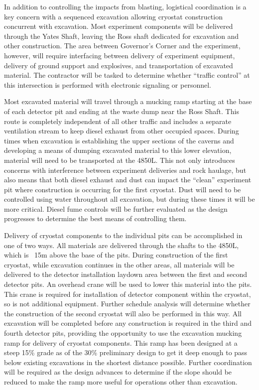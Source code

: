 In addition to controlling the impacts from blasting, logistical coordination is a key concern with a sequenced excavation allowing cryostat construction concurrent with excavation.  Most experiment components will be delivered through the Yates Shaft, leaving the Ross shaft dedicated for excavation and other construction.  The area between Governor’s Corner and the experiment, however, will require interfacing between delivery of experiment equipment, delivery of ground support and explosives, and transportation of excavated material.  The contractor will be tasked to determine whether “traffic control” at this intersection is performed with electronic signaling or personnel.

Most excavated material will travel through a mucking ramp starting at the base of each detector pit and ending at the waste dump near the Ross Shaft.  This route is completely independent of all other traffic and includes a separate ventilation stream to keep diesel exhaust from other occupied spaces.  During times when excavation is establishing the upper sections of the caverns and developing a means of dumping excavated material to this lower elevation, material will need to be transported at the 4850L.  This not only introduces concerns with interference between experiment deliveries and rock haulage, but also means that both diesel exhaust and dust can impact the “clean” experiment pit where construction is occurring for the first cryostat.  Dust will need to be controlled using water throughout all excavation, but during these times it will be more critical.  Diesel fume controls will be further evaluated as the design progresses to determine the best means of controlling them.

Delivery of cryostat components to the individual pits can be accomplished in one of two ways.  All materials are delivered through the shafts to the 4850L, which is ~15m above the base of the pits.  During construction of the first cryostat, while excavation continues in the other areas, all materials will be delivered to the detector installation laydown area between the first and second detector pits.  An overhead crane will be used to lower this material into the pits.  This crane is required for installation of detector component within the cryostat, so is not additional equipment.  Further schedule analysis will determine whether the construction of the second cryostat will also be performed in this way.  All excavation will be completed before any construction is required in the third and fourth detector pits, providing the opportunity to use the excavation mucking ramp for delivery of cryostat components.  This ramp has been designed at a steep 15\% grade as of the 30\% preliminary design to get it deep enough to pass below existing excavations in the shortest distance possible.  Further coordination will be required as the design advances to determine if the slope should be reduced to make the ramp more useful for operations other than excavation.

